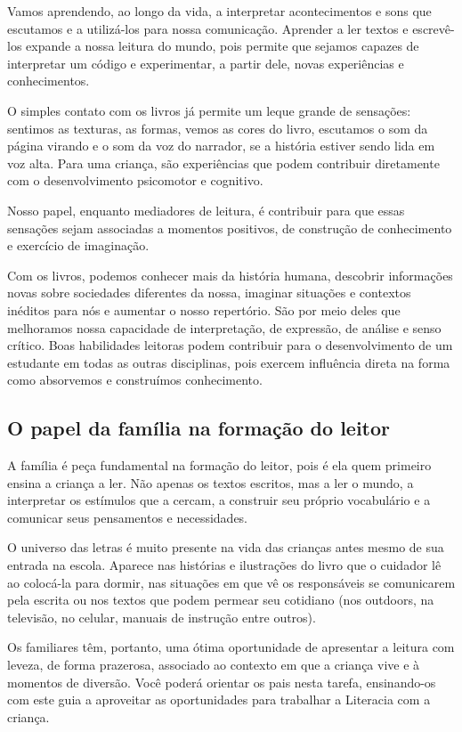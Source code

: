 \documentclass[11pt]{extarticle}
\begin{document}
Vamos aprendendo, ao longo da vida, a interpretar acontecimentos 
e sons que escutamos e a utilizá-los para nossa comunicação. Aprender a ler textos e 
escrevê-los expande a nossa leitura do mundo, pois permite que sejamos capazes de 
interpretar um código e experimentar, a partir dele, novas experiências e conhecimentos. 

O simples contato com os livros já permite um leque grande de sensações: 
sentimos as texturas, as formas, vemos as cores do livro, escutamos o som da página 
virando e o som da voz do narrador, se a história estiver sendo lida em voz alta. Para uma criança, são experiências que podem contribuir diretamente com o desenvolvimento psicomotor 
e cognitivo. 

Nosso papel, enquanto mediadores de leitura, é contribuir para que essas 
sensações sejam associadas a momentos positivos, de construção de 
conhecimento e exercício de imaginação. 

Com os livros, podemos conhecer mais da história humana, descobrir informações 
novas sobre sociedades diferentes da nossa, imaginar situações e contextos inéditos 
para nós e aumentar o nosso repertório. São por meio deles que melhoramos nossa 
capacidade de interpretação, de expressão, de análise e senso crítico. Boas habilidades 
leitoras podem contribuir para o desenvolvimento de um estudante em todas as outras 
disciplinas, pois exercem influência direta na forma como absorvemos e 
construímos conhecimento.


\subsection{O papel da família na formação do leitor}
A família é peça fundamental na formação do leitor, pois é ela quem primeiro 
ensina a criança a ler. Não apenas os textos escritos, mas a ler o mundo, a 
interpretar os estímulos que a cercam, a construir seu próprio vocabulário e a 
comunicar seus pensamentos e necessidades.

O universo das letras é muito presente na vida das crianças antes mesmo de sua 
entrada na escola. Aparece nas histórias e ilustrações do livro que o cuidador 
lê ao colocá-la para dormir, nas situações em que vê os responsáveis se comunicarem 
pela escrita ou nos textos que podem permear seu cotidiano (nos outdoors, na 
televisão, no celular, manuais de instrução entre outros). 

Os familiares têm, 
portanto, uma ótima oportunidade de apresentar a leitura com leveza, de forma 
prazerosa, associado ao contexto em que a criança vive e à momentos de diversão. 
Você poderá orientar os pais nesta tarefa, ensinando-os com este guia a aproveitar 
as oportunidades para trabalhar a Literacia com a criança.
\end{document}
